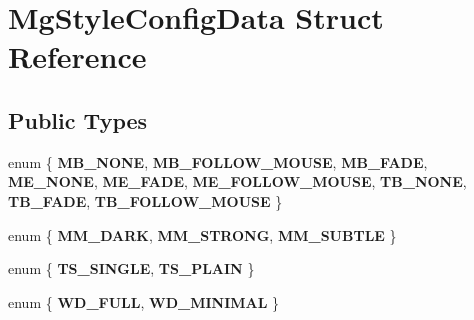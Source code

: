 \hypertarget{struct_mg_style_config_data}{}\section{Mg\+Style\+Config\+Data Struct Reference}
\label{struct_mg_style_config_data}
\subsection*{Public Types}
\begin{DoxyCompactItemize}
\item 
\mbox{\label{struct_mg_style_config_data_aba3024af245ce78f3ced37800588b8ae}} 
enum \{ \newline
{\bfseries M\+B\+\_\+\+N\+O\+NE}, 
{\bfseries M\+B\+\_\+\+F\+O\+L\+L\+O\+W\+\_\+\+M\+O\+U\+SE}, 
{\bfseries M\+B\+\_\+\+F\+A\+DE}, 
{\bfseries M\+E\+\_\+\+N\+O\+NE}, 
\newline
{\bfseries M\+E\+\_\+\+F\+A\+DE}, 
{\bfseries M\+E\+\_\+\+F\+O\+L\+L\+O\+W\+\_\+\+M\+O\+U\+SE}, 
{\bfseries T\+B\+\_\+\+N\+O\+NE}, 
{\bfseries T\+B\+\_\+\+F\+A\+DE}, 
\newline
{\bfseries T\+B\+\_\+\+F\+O\+L\+L\+O\+W\+\_\+\+M\+O\+U\+SE}
 \}
\item 
\mbox{\label{struct_mg_style_config_data_a35b52d0033e06fc7920594dd337dd347}} 
enum \{ {\bfseries M\+M\+\_\+\+D\+A\+RK}, 
{\bfseries M\+M\+\_\+\+S\+T\+R\+O\+NG}, 
{\bfseries M\+M\+\_\+\+S\+U\+B\+T\+LE}
 \}
\item 
\mbox{\label{struct_mg_style_config_data_ab2b6f98b42ef901a8042c9e8e78f645f}} 
enum \{ {\bfseries T\+S\+\_\+\+S\+I\+N\+G\+LE}, 
{\bfseries T\+S\+\_\+\+P\+L\+A\+IN}
 \}
\item 
\mbox{\label{struct_mg_style_config_data_aa14a8c019889dd9e9cff2157a5b68057}} 
enum \{ {\bfseries W\+D\+\_\+\+F\+U\+LL}, 
{\bfseries W\+D\+\_\+\+M\+I\+N\+I\+M\+AL}
 \}
\end{DoxyCompactItemize}
